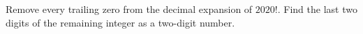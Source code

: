 Remove every trailing zero from the decimal expansion of $2020!$. Find the last two digits of the remaining integer as a two-digit number.
